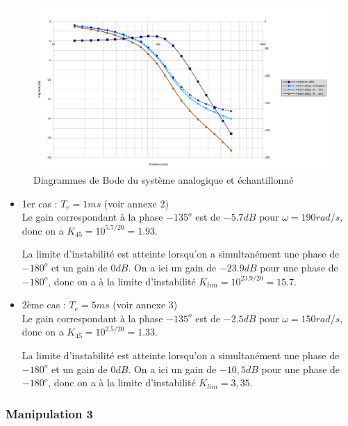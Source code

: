 \documentclass[../../Cours_M1.tex]{subfiles}
\begin{document}
\begin{figure}[h!]
\includegraphics[scale=0.4]{Bode2.png}
\caption{Diagrammes de Bode du système analogique et échantillonné}
\end{figure}

\begin{itemize}
\item 1er cas : $T_e = 1ms$ (voir annexe 2)\\

Le gain correspondant à la phase $-135^o$ est de $-5.7dB$ pour $\omega=190rad/s$, donc on a $K_{45} = 10^{5.7/20} = 1.93$.

La limite d'instabilité est atteinte lorsqu'on a simultanément une phase de $-180^o$ et un gain de $0dB$. On a ici un gain de $-23.9dB$ pour une phase de $-180^o$, donc on a à la limite d'instabilité $K_{lim}=10^{23.9/20}=15.7$.


\clearpage

\item 2ème cas : $T_e = 5ms$ (voir annexe 3)\\

Le gain correspondant à la phase $-135^o$ est de $-2.5dB$ pour $\omega=150rad/s$, donc on a $K_{45} = 10^{2.5/20} = 1.33$.

La limite d'instabilité est atteinte lorsqu'on a simultanément une phase de $-180^o$ et un gain de $0dB$. On a ici un gain de $-10,5dB$ pour une phase de $-180^o$, donc on a à la limite d'instabilité $K_{lim}=3,35$.

\end{itemize}

\clearpage

\subsubsection*{Manipulation 3}
\end{document}
